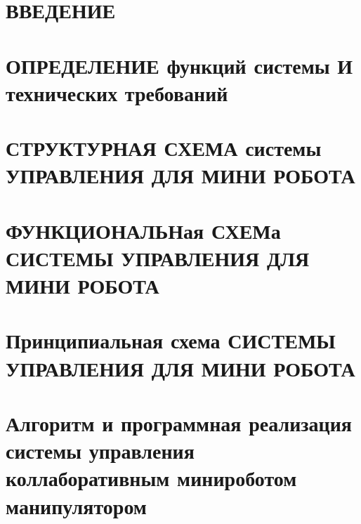 
\section*{ВВЕДЕНИЕ}


\section{ОПРЕДЕЛЕНИЕ функций системы И технических требований}


\section{СТРУКТУРНАЯ СХЕМА системы УПРАВЛЕНИЯ ДЛЯ МИНИ РОБОТА }


\section{ФУНКЦИОНАЛЬНая СХЕМа СИСТЕМЫ УПРАВЛЕНИЯ ДЛЯ МИНИ РОБОТА}


\section{Принципиальная схема СИСТЕМЫ УПРАВЛЕНИЯ ДЛЯ МИНИ РОБОТА}

\section{Алгоритм и программная реализация системы управления коллаборативным минироботом манипулятором}








% 

